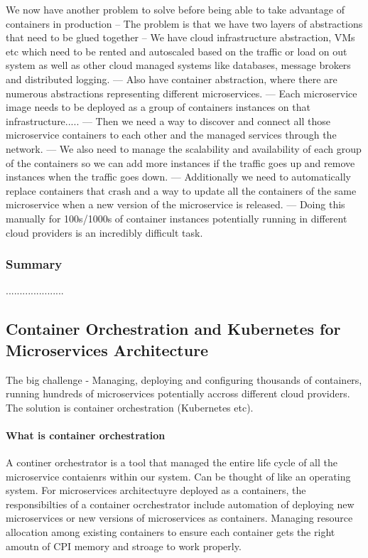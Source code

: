 \documentclass[a4paper, 11pt]{book}
\begin{document}
    We now have another problem to solve before being able to take advantage of containers in production
    -- The problem is that we have two layers of abstractions that need to be glued together
    -- We have cloud infrastructure abstraction, VMs etc which need to be rented and autoscaled based on the traffic or load on out system as well as other cloud managed systems like databases, message brokers and distributed logging.
    --- Also have container abstraction, where there are numerous abstractions representing different microservices.
    --- Each microservice image needs to be deployed as a group of containers instances on that infrastructure.....
    --- Then we need a way to discover and connect all those microservice containers to each other and the managed services through the network.
    --- We also need to manage the scalability and availability of each group of the containers so we can add more instances if the traffic goes up and remove instances when the traffic goes down.
    --- Additionally we need to automatically replace containers that crash and a way to update all the containers of the same microservice when a new version of the microservice is released.
    --- Doing this manually for 100s/1000s of container instances potentially running in different cloud providers is an incredibly difficult task.

    \subsubsection{Summary}
    .....................

    \subsection{Container Orchestration and Kubernetes for Microservices Architecture}
    The big challenge - Managing, deploying and configuring thousands of containers, running hundreds of microservices potentially accross different cloud providers.
    The solution is container orchestration (Kubernetes etc).

    \paragraph{What is container orchestration}
    A continer orchestrator is a tool that managed the entire life cycle of all the microservice contaienrs within our system.
    Can be thought of like an operating system.
    For microservices architectuyre deployed as a containers, the responsibilties of a container ocrchestrator include automation of deploying new microservices or new versions of microservices as containers.
    Managing resource allocation among existing containers to ensure each container gets the right amoutn of CPI memory and stroage to work properly.
\end{document}
